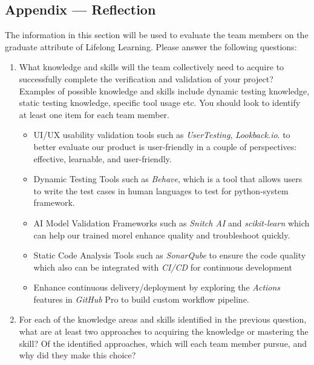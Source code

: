 \documentclass[12pt, titlepage]{article}
\begin{document}
\begin{itemize}
\newpage

\section{Appendix --- Reflection}


The information in this section will be used to evaluate the team members on the
graduate attribute of Lifelong Learning.  Please answer the following questions:

\begin{enumerate}
  \item What knowledge and skills will the team collectively need to acquire to
  successfully complete the verification and validation of your project?
  Examples of possible knowledge and skills include dynamic testing knowledge,
  static testing knowledge, specific tool usage etc.  You should look to
  identify at least one item for each team member.


  \begin{itemize}
    \item UI/UX usability validation tools such  as \textit{UserTesting}, \textit{Lookback.io}. to better evaluate our product is user-friendly in a couple of perspectives: effective, learnable, and user-friendly.
    \item Dynamic Testing Tools such as \textit{Behave}, which is a tool that allows users to write the test cases in human languages to test for python-system framework. 
    \item AI Model Validation Frameworks such as \textit{Snitch AI} and \textit{scikit-learn} which can help our trained morel enhance quality and troubleshoot quickly.
    \item Static Code Analysis Tools such as \textit{SonarQube} to ensure the code quality which also can be integrated with \textit{CI/CD} for continuous development
    \item Enhance continuous delivery/deployment by exploring the \textit{Actions} features in \textit{GitHub} Pro to build custom workflow pipeline.
   \end{itemize} 


  \item For each of the knowledge areas and skills identified in the previous
  question, what are at least two approaches to acquiring the knowledge or
  mastering the skill?  Of the identified approaches, which will each team
  member pursue, and why did they make this choice?


\end{enumerate}
\end{itemize}
\end{document}
